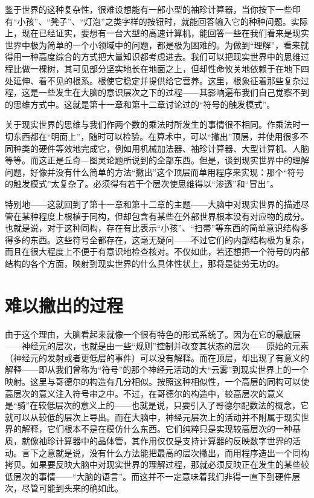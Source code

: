 鉴于世界的这种复杂性，很难设想能有一部小型的袖珍计算器，当你按下一些印有“小孩”、“凳子”、“灯泡”之类字样的按钮时，就能回答输入它的种种问题。实际上，现在已经证实，要想有一台大型的高速计算机，能回答一些在我们看来是现实世界中极为简单的一个小领域中的问题，都是极为困难的。为做到“理解”，看来就得用一种高度综合的方式把大量知识都考虑进去。我们可以把现实世界中的思维过程比做一棵树，其可见部分坚实地长在地面之上，但却性命攸关地依赖于在地下四处延伸、看不见的根系。根使它稳定并提供给它营养。这里，根象征着那些复杂过程，这是一些发生在大脑的意识层次之下的过程——其影响遍布我们自己觉察不到的思维方式中。这就是第十一章和第十二章讨论过的“符号的触发模式”。

关于现实世界的思维与我们作两个数的乘法时所发生的事情很不相同。作乘法时一切东西都在“明面上”，随时可以检验。在算术中，可以“撇出”顶层，并使用很多不同种类的硬件等效地完成它，例如用机械加法器、袖珍计算器、大型计算机、人脑等等。而这正是丘奇—图灵论题所说到的全部东西。但是，谈到现实世界中的理解问题，好像并没有什么简单的方法“撇出”这个顶层而单用程序来实现：那个“符号的触发模式”太复杂了。必须得有若干个层次使思维得以“渗透”和“冒出”。

特别地——这就回到了第十一章和第十二章的主题——大脑中对现实世界的描述尽管在某种程度上根植于同构，但却包含有某些在外部世界根本没有对应物的成分。也就是说，对于这种同构，存在有比表示“小孩”、“扫帚”等东西的简单意识结构多得多的东西。这些符号全都存在，这毫无疑问——不过它们的内部结构极为复杂，而且在很大程度上不便于有意识地检查核对。不仅如此，若还想把一个符号的内部结构的各个方面，映射到现实世界的什么具体性状上，那将是徒劳无功的。

\section{难以撇出的过程}

由于这个理由，大脑看起来就像一个很有特色的形式系统了。因为在它的最底层——神经元的层次，也就是由一些“规则”控制并改变其状态的层次——原始的元素（神经元的发射或者更低层的事件）可以没有解释。而在顶层，却出现了有意义的解释——即从我们曾称为“符号”的那个神经元活动的大“云雾”到现实世界上的一个映射。这里与哥德尔的构造有几分相似。按照这种相似性，一个高层的同构可以使高层次的意义注入符号串之中。不过，在哥德尔的构造中，较高层次的意义是“骑”在较低层次的意义上的——也就是说，只要引入了哥德尔配数法的概念，它就可以从较低的层次上导出。而在大脑中，神经元层次上的活动并不附属于现实世界的解释，它们根本不是在模仿什么东西。它们纯粹只是实现较高层次的一种基质，就像袖珍计算器中的晶体管，其作用仅仅是支持计算器的反映数字世界的活动。言下之意就是说，没有什么方法能把最高的层次撇出，而用程序造出一个同构拷贝。如果要反映大脑中对现实世界的理解过程，那就必须反映正在发生的某些较低层次的事情——“大脑的语言”。而这并不一定意味着我们非得一直下到硬件层次，尽管可能到头来的确如此。

